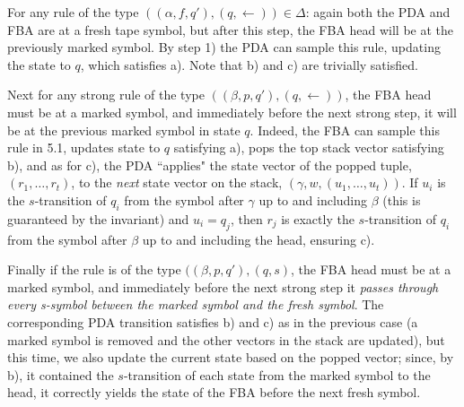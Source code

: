 \documentclass[11pt]{article}
\begin{document}
For any rule of the type $((\alpha,f,q'),(q,\leftarrow)) \in \Delta$: again both the PDA and FBA are at a fresh tape symbol, but after this step, the FBA head will be at the previously marked symbol. By step 1) the PDA can sample this rule, updating the state to $q$, which satisfies a). Note that b) and c) are trivially satisfied.

Next for any strong rule of the type $((\beta,p,q'),(q,\leftarrow))$, the FBA head must be at a marked symbol, and immediately before the next strong step, it will be at the previous marked symbol in state $q$. Indeed, the FBA can sample this rule in 5.1, updates state to $q$ satisfying a), pops the top stack vector satisfying b), and as for c),  the PDA ``applies" the state vector of the popped tuple, $(r_1,\ldots,r_t)$, to the {\em next} state vector on the stack, $(\gamma,w,(u_1,\ldots,u_t))$. If $u_i$ is the $s$-transition of $q_i$ from the symbol after $\gamma$ up to and including $\beta$ (this is guaranteed by the invariant) and $u_i = q_j$, then $r_j$ is exactly the $s$-transition of $q_i$ from the symbol after $\beta$ up to and including the head, ensuring c).

Finally if the rule is of the type $((\beta,p,q'),(q,s)$, the FBA head must be at a marked symbol, and immediately before the next strong step it {\em passes through every s-symbol between the marked symbol and the fresh symbol}. The corresponding PDA transition satisfies b) and c) as in the previous case (a marked symbol is removed and the other vectors in the stack are updated), but this time, we also update the current state based on the popped vector; since, by b), it contained the $s$-transition of each state from the marked symbol to the head, it correctly yields the state of the FBA before the next fresh symbol.



\end{document}
